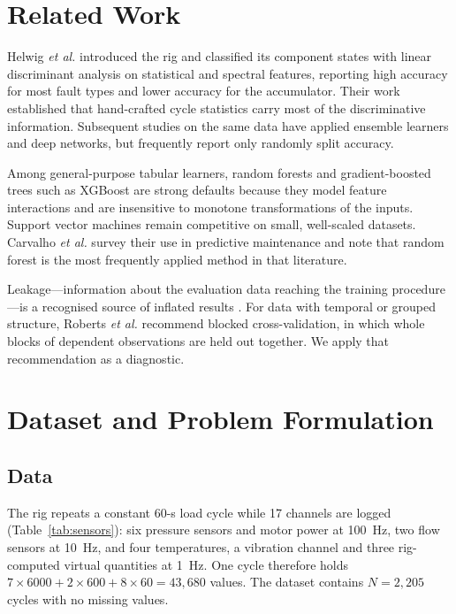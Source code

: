 \documentclass[conference]{IEEEtran}
\begin{document}
\section{Related Work}
Helwig \textit{et al.} \cite{helwig2015} introduced the rig and classified its
component states with linear discriminant analysis on statistical and
spectral features, reporting high accuracy for most fault types and lower
accuracy for the accumulator. Their work established that hand-crafted cycle
statistics carry most of the discriminative information. Subsequent studies on
the same data have applied ensemble learners and deep networks, but frequently
report only randomly split accuracy.

Among general-purpose tabular learners, random forests \cite{breiman2001} and
gradient-boosted trees such as XGBoost \cite{chen2016} are strong defaults
because they model feature interactions and are insensitive to monotone
transformations of the inputs. Support vector machines \cite{cortes1995}
remain competitive on small, well-scaled datasets. Carvalho \textit{et al.}
\cite{carvalho2019} survey their use in predictive maintenance and note that
random forest is the most frequently applied method in that literature.

Leakage---information about the evaluation data reaching the training
procedure---is a recognised source of inflated results \cite{kaufman2012}.
For data with temporal or grouped structure, Roberts \textit{et al.}
\cite{roberts2017} recommend blocked cross-validation, in which whole blocks of
dependent observations are held out together. We apply that recommendation as
a diagnostic.

\section{Dataset and Problem Formulation}
\subsection{Data}
The rig repeats a constant 60-s load cycle while 17 channels are logged
(Table~\ref{tab:sensors}): six pressure sensors and motor power at 100~Hz, two
flow sensors at 10~Hz, and four temperatures, a vibration channel and three
rig-computed virtual quantities at 1~Hz. One cycle therefore holds
$7\times6000 + 2\times600 + 8\times60 = 43{,}680$ values. The dataset contains
$N = 2{,}205$ cycles with no missing values.
\end{document}
